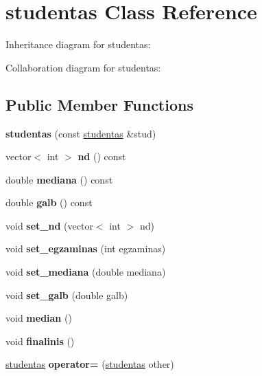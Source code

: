 \hypertarget{classstudentas}{}\section{studentas Class Reference}
\label{classstudentas}


Inheritance diagram for studentas\+:


Collaboration diagram for studentas\+:
\subsection*{Public Member Functions}
\begin{DoxyCompactItemize}
\item 
\mbox{\label{classstudentas_ac648c94aba4bd7b29b640fb927b2504e}} 
{\bfseries studentas} (const \hyperlink{classstudentas}{studentas} \&stud)
\item 
\mbox{\label{classstudentas_addbf19261dc2eae56a5d55ec83bca846}} 
vector$<$ int $>$ {\bfseries nd} () const
\item 
\mbox{\label{classstudentas_aaa3af7da676230b5a5253a02ab53592c}} 
double {\bfseries mediana} () const
\item 
\mbox{\label{classstudentas_ab965946232c78ce0042c1dccdc710ed5}} 
double {\bfseries galb} () const
\item 
\mbox{\label{classstudentas_ad62cb93ee131cb900049d85869114e40}} 
void {\bfseries set\+\_\+nd} (vector$<$ int $>$ nd)
\item 
\mbox{\label{classstudentas_ae3ce4e194a4c7a46bde6b5c4fc2acd20}} 
void {\bfseries set\+\_\+egzaminas} (int egzaminas)
\item 
\mbox{\label{classstudentas_a035d43004e13ca30cfbab3c82c09563d}} 
void {\bfseries set\+\_\+mediana} (double mediana)
\item 
\mbox{\label{classstudentas_aafabdb2b69c377690ea716e4c2d0d4af}} 
void {\bfseries set\+\_\+galb} (double galb)
\item 
\mbox{\label{classstudentas_a25e2226181bf41a8f76d3493eca1b57f}} 
void {\bfseries median} ()
\item 
\mbox{\label{classstudentas_abee2003b3e99edcef216bb274838c2b7}} 
void {\bfseries finalinis} ()
\item 
\mbox{\label{classstudentas_a80ab258d8c58da840a8026818998ec01}} 
\hyperlink{classstudentas}{studentas} {\bfseries operator=} (\hyperlink{classstudentas}{studentas} other)
\end{DoxyCompactItemize}
